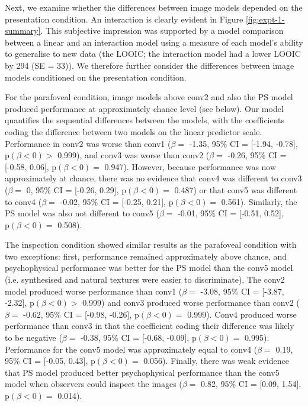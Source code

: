 \documentclass[doc, 11pt,a4paper,natbib]{apa6}\usepackage[]{graphicx}\usepackage[]{color}
\begin{document}
Next, we examine whether the differences between image models depended on the presentation condition.
An interaction is clearly evident in Figure \ref{fig:expt-1-summary}.
This subjective impression was supported by a model comparison between a linear and an interaction model using a measure of each model's ability to generalise to new data (the LOOIC; the interaction model had a lower LOOIC by
294 (SE = 33)).
We therefore further consider the differences between image models conditioned on the presentation condition.

For the parafoveal condition, image models above conv2 and also the PS model produced performance at approximately chance level (see below).
Our model quantifies the sequential differences between the models, with the coefficients coding the difference between two models on the linear predictor scale.
Performance in conv2 was worse than conv1
($\beta = $ -1.35, 95\% CI = [-1.94, -0.78], $\mathrm{p}(\beta < 0) > $ 0.999),
and conv3 was worse than conv2
($\beta = $ -0.26, 95\% CI = [-0.58, 0.06], $\mathrm{p}(\beta < 0) = $ 0.947).
However, because performance was now approximately at chance, there was no evidence that conv4 was different to conv3
($\beta = $ 0, 95\% CI = [-0.26, 0.29], $\mathrm{p}(\beta < 0) = $ 0.487)
or that conv5 was different to conv4
($\beta = $ -0.02, 95\% CI = [-0.25, 0.21], $\mathrm{p}(\beta < 0) = $ 0.561).
Similarly, the PS model was also not different to conv5
($\beta = $ -0.01, 95\% CI = [-0.51, 0.52], $\mathrm{p}(\beta < 0) = $ 0.508).

The inspection condition showed similar results as the parafoveal condition with two exceptions: first, performance remained approximately above chance, and psychophysical performance was better for the PS model than the conv5 model (i.e. synthesised and natural textures were easier to discriminate).
The conv2 model produced worse performance than conv1
($\beta = $ -3.08, 95\% CI = [-3.87, -2.32], $\mathrm{p}(\beta < 0) > $ 0.999) and
conv3 produced worse performance than conv2
($\beta = $ -0.62, 95\% CI = [-0.98, -0.26], $\mathrm{p}(\beta < 0) = $ 0.999).
Conv4 produced worse performance than conv3 in that the coefficient coding their difference was likely to be negative
($\beta = $ -0.38, 95\% CI = [-0.68, -0.09], $\mathrm{p}(\beta < 0) = $ 0.995).
Performance for the conv5 model was approximately equal to conv4
($\beta = $ 0.19, 95\% CI = [-0.05, 0.43], $\mathrm{p}(\beta < 0) = $ 0.056).
Finally, there was weak evidence that PS model produced better psychophysical performance than the conv5 model when observers could inspect the images
($\beta = $ 0.82, 95\% CI = [0.09, 1.54], $\mathrm{p}(\beta < 0) = $ 0.014).
\end{document}
